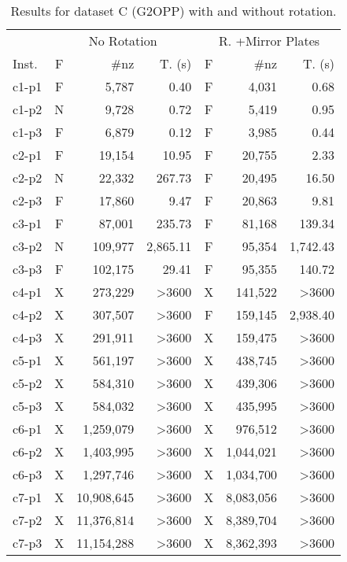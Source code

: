 \begin{table}[!t]
\centering
\caption{Results for dataset C (G2OPP) with and without rotation.}
\label{tab:g2opp_C_joined}
\begin{tabular}{lcrrcrr}
\hline\hline
& \multicolumn{3}{c}{No Rotation} & \multicolumn{3}{c}{R. +Mirror Plates} \\\cmidrule(lr){2-4}\cmidrule(lr){5-7}
Inst. & F & \#nz & T. (s) & F & \#nz & T. (s) \\\hline
c1-p1 & F & 5,787 & 0.40 & F & 4,031 & 0.68 \\
c1-p2 & N & 9,728 & 0.72 & F & 5,419 & 0.95 \\
c1-p3 & F & 6,879 & 0.12 & F & 3,985 & 0.44 \\
c2-p1 & F & 19,154 & 10.95 & F & 20,755 & 2.33 \\
c2-p2 & N & 22,332 & 267.73 & F & 20,495 & 16.50 \\
c2-p3 & F & 17,860 & 9.47 & F & 20,863 & 9.81 \\
c3-p1 & F & 87,001 & 235.73 & F & 81,168 & 139.34 \\
c3-p2 & N & 109,977 & 2,865.11 & F & 95,354 & 1,742.43 \\
c3-p3 & F & 102,175 & 29.41 & F & 95,355 & 140.72 \\
c4-p1 & X & 273,229 & >3600 & X & 141,522 & >3600 \\
c4-p2 & X & 307,507 & >3600 & F & 159,145 & 2,938.40 \\
c4-p3 & X & 291,911 & >3600 & X & 159,475 & >3600 \\
c5-p1 & X & 561,197 & >3600 & X & 438,745 & >3600 \\
c5-p2 & X & 584,310 & >3600 & X & 439,306 & >3600 \\
c5-p3 & X & 584,032 & >3600 & X & 435,995 & >3600 \\
c6-p1 & X & 1,259,079 & >3600 & X & 976,512 & >3600 \\
c6-p2 & X & 1,403,995 & >3600 & X & 1,044,021 & >3600 \\
c6-p3 & X & 1,297,746 & >3600 & X & 1,034,700 & >3600 \\
c7-p1 & X & 10,908,645 & >3600 & X & 8,083,056 & >3600 \\
c7-p2 & X & 11,376,814 & >3600 & X & 8,389,704 & >3600 \\
c7-p3 & X & 11,154,288 & >3600 & X & 8,362,393 & >3600 \\\hline\hline
\end{tabular}%
\end{table}

